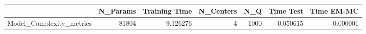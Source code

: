 \begin{tabular}{lrrrrrr}
\toprule
{} &  N\_Params &  Training Time &  N\_Centers &   N\_Q &  Time Test &  Time EM-MC \\
\midrule
Model\_Complexity\_metrics &     81804 &       9.126276 &          4 &  1000 &  -0.050615 &   -0.000001 \\
\bottomrule
\end{tabular}
